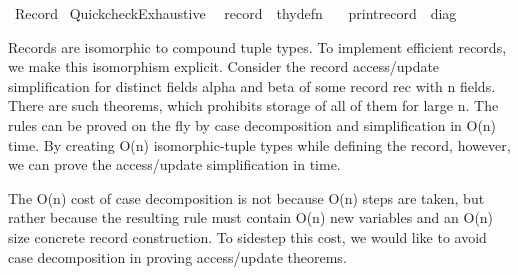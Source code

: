 %
\begin{isabellebody}%
%
%
\isadelimdocument
%
\endisadelimdocument
%
\isatagdocument
%
\isamarkuptrue%
%
\endisatagdocument
{\isafolddocument}%
%
\isadelimdocument
%
\endisadelimdocument
%
\isadelimtheory
%
\endisadelimtheory
%
\isatagtheory
{}\isamarkupfalse%
\ Record\isanewline
{}\ Quickcheck{\isacharunderscore}{\kern0pt}Exhaustive\isanewline
{}\isanewline
\ \ {\isachardoublequoteopen}record{\isachardoublequoteclose}\ {\isacharcolon}{\kern0pt}{\isacharcolon}{\kern0pt}\ thy{\isacharunderscore}{\kern0pt}defn\ \isanewline
\ \ {\isachardoublequoteopen}print{\isacharunderscore}{\kern0pt}record{\isachardoublequoteclose}\ {\isacharcolon}{\kern0pt}{\isacharcolon}{\kern0pt}\ diag\isanewline
{}%
\endisatagtheory
{\isafoldtheory}%
%
\isadelimtheory
%
\endisadelimtheory
%
\isadelimdocument
%
\endisadelimdocument
%
\isatagdocument
%
\isamarkuptrue%
%
\endisatagdocument
{\isafolddocument}%
%
\isadelimdocument
%
\endisadelimdocument
%
\begin{isamarkuptext}%
Records are isomorphic to compound tuple types. To implement
  efficient records, we make this isomorphism explicit. Consider the
  record access/update simplification  for distinct fields alpha and beta of some record
  rec with n fields. There are  such theorems, which
  prohibits storage of all of them for large n. The rules can be
  proved on the fly by case decomposition and simplification in O(n)
  time. By creating O(n) isomorphic-tuple types while defining the
  record, however, we can prove the access/update simplification in
   time.

  The O(n) cost of case decomposition is not because O(n) steps are
  taken, but rather because the resulting rule must contain O(n) new
  variables and an O(n) size concrete record construction. To sidestep
  this cost, we would like to avoid case decomposition in proving
  access/update theorems.


\end{isamarkuptext}
\end{isabellebody}
